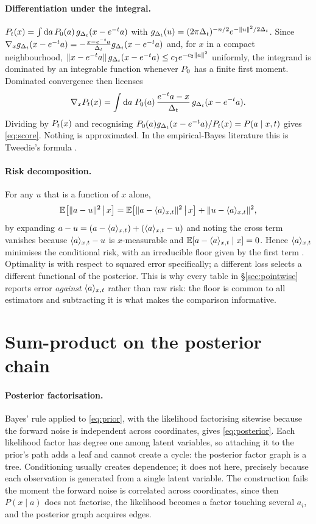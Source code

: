 \paragraph{Differentiation under the integral.}
$P_t(x) = \int\mathrm{d}a\,P_0(a)\,g_{\Delta_t}(x-e^{-t}a)$ with
$g_{\Delta_t}(u) = (2\pi\Delta_t)^{-n/2}e^{-\|u\|^2/2\Delta_t}$. Since
$\nabla_x g_{\Delta_t}(x-e^{-t}a) = -\frac{x-e^{-t}a}{\Delta_t}g_{\Delta_t}(x-e^{-t}a)$ and, for $x$ in a
compact neighbourhood, $\|x-e^{-t}a\|\,g_{\Delta_t}(x-e^{-t}a) \le c_1 e^{-c_2\|a\|^2}$ uniformly, the
integrand is dominated by an integrable function whenever $P_0$ has a finite first moment.
Dominated convergence then licenses
\[
\nabla_x P_t(x)
= \int \mathrm{d}a\; P_0(a)\,\frac{e^{-t}a - x}{\Delta_t}\, g_{\Delta_t}(x-e^{-t}a).
\]
Dividing by $P_t(x)$ and recognising $P_0(a)g_{\Delta_t}(x-e^{-t}a)/P_t(x) = P(a\mid x,t)$ gives
\eqref{eq:score}. Nothing is approximated. In the empirical-Bayes literature this is Tweedie's
formula \citep{robbins1956,miyasawa1961,efron2011}.

\paragraph{Risk decomposition.} For any $u$ that is a function of $x$ alone,
\begin{equation}
\label{eq:orthogonal}
\mathbb{E}\!\left[\|a-u\|^2 \,\middle|\, x\right]
= \mathbb{E}\!\left[\|a - \langle a \rangle_{x,t}\|^2 \,\middle|\, x\right] + \|u - \langle a \rangle_{x,t}\|^2 ,
\end{equation}
by expanding $a-u = (a-\langle a \rangle_{x,t}) + (\langle a \rangle_{x,t}-u)$ and noting the cross term vanishes because
$\langle a \rangle_{x,t}-u$ is $x$-measurable and $\mathbb{E}[a-\langle a \rangle_{x,t}\mid x]=0$. Hence $\langle a \rangle_{x,t}$ minimises the
conditional risk, with an irreducible floor given by the first term \citep{lehmann1998}.
Optimality is with respect to squared error specifically; a different loss selects a different
functional of the posterior. This is why every table in \S\ref{sec:pointwise} reports error
\emph{against} $\langle a \rangle_{x,t}$ rather than raw risk: the floor is common to all estimators and
subtracting it is what makes the comparison informative.

\section{Sum-product on the posterior chain}
\label{app:bp}

\paragraph{Posterior factorisation.} Bayes' rule applied to \eqref{eq:prior}, with the likelihood
factorising sitewise because the forward noise is independent across coordinates, gives
\eqref{eq:posterior}. Each likelihood factor has degree one among latent variables, so attaching
it to the prior's path adds a leaf and cannot create a cycle: the posterior factor graph is a
tree. Conditioning usually creates dependence; it does not here, precisely because each
observation is generated from a single latent variable. The construction fails the moment the
forward noise is correlated across coordinates, since then $P(x\mid a)$ does not factorise, the
likelihood becomes a factor touching several $a_i$, and the posterior graph acquires edges.

